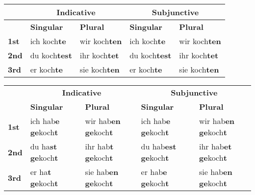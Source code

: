 \documentclass[a4paper,20pt]{article}
\newcommand{\grammarending}[1]{\textbf{\textcolor{endingcolor}{#1}}}
\begin{document}
\begin{tabular}{|l|l|l|l|l|}
\hline
\rowcolor{lightgray}
& \multicolumn{2}{c|}{\textbf{Indicative}} & \multicolumn{2}{c|}{\textbf{Subjunctive}} \\
\hline
\rowcolor{lightgray}
& \textbf{Singular} & \textbf{Plural} & \textbf{Singular} & \textbf{Plural} \\
\hline
\textbf{1st} & ich koch\grammarending{te} & wir koch\grammarending{ten} & ich koch\grammarending{te} & wir koch\grammarending{ten}\\
\hline
\textbf{2nd} & du koch\grammarending{test} & ihr koch\grammarending{tet} & du koch\grammarending{test} & ihr koch\grammarending{tet}\\
\hline
\textbf{3rd} & er koch\grammarending{te} & sie koch\grammarending{ten} & er koch\grammarending{te} & sie koch\grammarending{ten}\\
\hline
\end{tabular}


\begin{tabular}{|l|l|l|l|l|}
\hline
\rowcolor{lightgray}
\multicolumn{5}{|c|}{\textbf{Perfect}} \\
\hline
\rowcolor{lightgray}
& \multicolumn{2}{c|}{\textbf{Indicative}} & \multicolumn{2}{c|}{\textbf{Subjunctive}} \\
\hline
\rowcolor{lightgray}
& \textbf{Singular} & \textbf{Plural} & \textbf{Singular} & \textbf{Plural} \\
\hline
\textbf{1st} & ich hab\grammarending{e} \grammarending{ge}koch\grammarending{t} & wir hab\grammarending{en} \grammarending{ge}koch\grammarending{t} & ich hab\grammarending{e} \grammarending{ge}koch\grammarending{t} & wir hab\grammarending{en} \grammarending{ge}koch\grammarending{t} \\
\hline
\textbf{2nd} & du ha\grammarending{st} \grammarending{ge}koch\grammarending{t} & ihr hab\grammarending{t} \grammarending{ge}koch\grammarending{t} & du hab\grammarending{est} \grammarending{ge}koch\grammarending{t} & ihr hab\grammarending{et} \grammarending{ge}koch\grammarending{t} \\
\hline
\textbf{3rd} & er ha\grammarending{t} \grammarending{ge}koch\grammarending{t} & sie hab\grammarending{en} \grammarending{ge}koch\grammarending{t} & er hab\grammarending{e} \grammarending{ge}koch\grammarending{t} & sie hab\grammarending{en} \grammarending{ge}koch\grammarending{t} \\
\hline
\end{tabular}
\end{document}
